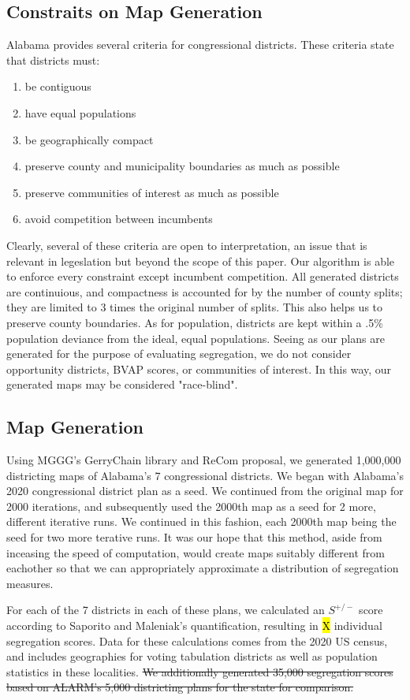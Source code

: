 \documentclass{article}
\begin{document}
\subsection{Constraits on Map Generation}\label{constraints}

Alabama provides several criteria for congressional districts. These criteria state that districts must:

\begin{enumerate}
	\item be contiguous
	\item have equal populations
    \item be geographically compact
    \item preserve county and municipality boundaries as much as possible
    \item preserve communities of interest as much as possible
    \item avoid competition between incumbents
\end{enumerate}

Clearly, several of these criteria are open to interpretation, an issue that is relevant in legeslation but beyond the scope of this paper. Our algorithm is able to enforce every constraint except incumbent competition. All generated districts are continuious, and compactness is accounted for by the number of county splits; they are limited to 3 times the original number of splits. This also helps us to preserve county boundaries. As for population, districts are kept within a .5\% population deviance from the ideal, equal populations. Seeing as our plans are generated for the purpose of evaluating segregation, we do not consider opportunity districts, BVAP scores, or communities of interest. In this way, our generated maps may be considered "race-blind".

\subsection{Map Generation}\label{generation}
Using MGGG’s GerryChain library and ReCom proposal, we generated 1,000,000 districting maps of Alabama’s 7 congressional districts. We began with Alabama’s 2020 congressional district plan as a seed. We continued from the original map for 2000 iterations, and subsequently used the 2000th map as a seed for 2 more, different iterative runs. We continued in this fashion, each 2000th map being the seed for two more terative runs. It was our hope that this method, aside from inceasing the speed of computation, would create maps suitably different from eachother so that we can appropriately approximate a distribution of segregation measures.
\par
For each of the 7 districts in each of these plans, we calculated an $S^{+/-}$ score according to Saporito and Maleniak’s quantification, resulting in \hl{X} individual segregation scores. Data for these calculations comes from the 2020 US census, and includes geographies for voting tabulation districts as well as population statistics in these localities. \st{We additionally generated 35,000 segregation scores based on ALARM's 5,000 districting plans for the state for comparison.}
\end{document}
